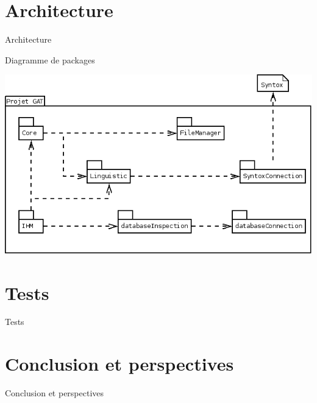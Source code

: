 \documentclass[11pt]{beamer}
\begin{document}
\section{Architecture}
\begin{frame}{Architecture}
\begin{block}{Diagramme de packages}
\begin{center}
\includegraphics[scale=0.4]{DiagPackages.png}
\end{center}
\end{block}
\end{frame}

\section{Tests}
\begin{frame}{Tests}
\end{frame}


\section{Conclusion et perspectives}
\begin{frame}{Conclusion et perspectives}
\end{frame}
\end{document}
